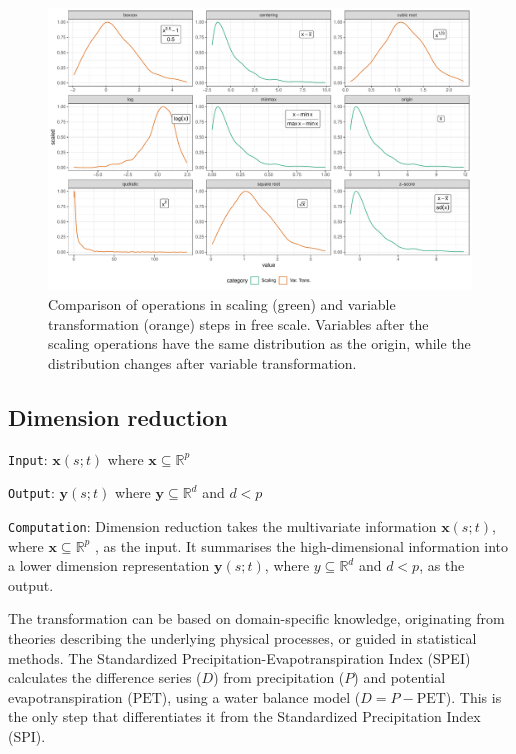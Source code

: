 \documentclass[
]{interact}
\begin{document}
\begin{figure}

{\centering \includegraphics{tidyindex_files/figure-pdf/fig-scale-var-trans-compare-1.pdf}

}

\caption{\label{fig-scale-var-trans-compare}Comparison of operations in
scaling (green) and variable transformation (orange) steps in free
scale. Variables after the scaling operations have the same distribution
as the origin, while the distribution changes after variable
transformation.}

\end{figure}

\hypertarget{dimension-reduction}{%
\subsection{Dimension reduction}\label{dimension-reduction}}

\texttt{Input}: \(\mathbf{x}(s;t)\) where
\(\mathbf{x} \subseteq \mathbb{R}^p\)

\texttt{Output}: \(\mathbf{y}(s;t)\) where
\(\mathbf{y} \subseteq \mathbb{R}^d\) and \(d < p\)

\texttt{Computation}: Dimension reduction takes the multivariate
information \(\mathbf{x}(s;t)\), where
\(\mathbf{x} \subseteq \mathbb{R}^p\) , as the input. It summarises the
high-dimensional information into a lower dimension representation
\(\mathbf{y}(s;t)\), where \(y \subseteq \mathbb{R}^d\) and \(d < p\),
as the output.

The transformation can be based on domain-specific knowledge,
originating from theories describing the underlying physical processes,
or guided in statistical methods. The Standardized
Precipitation-Evapotranspiration Index (SPEI) calculates the difference
series (\(D\)) from precipitation (\(P\)) and potential
evapotranspiration (\(\text{PET}\)), using a water balance model
(\(D = P - \text{PET}\)). This is the only step that differentiates it
from the Standardized Precipitation Index (SPI).
\end{document}
